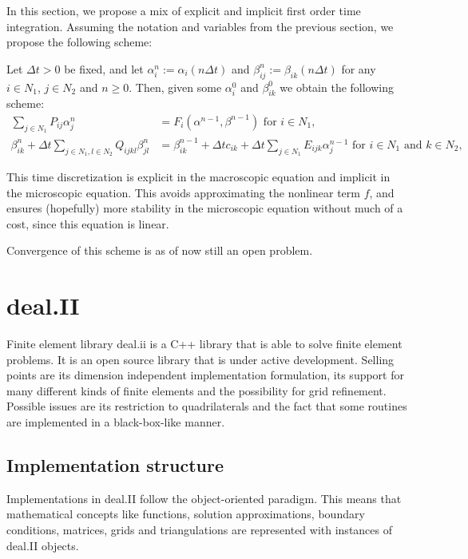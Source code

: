 \documentclass{article}
\begin{document}
In this section, we propose a mix of explicit and implicit first order time integration. Assuming the notation and variables from the previous section, we propose the following scheme:

Let $\Delta t>0$ be fixed, and let $\alpha_i^n := \alpha_i(n\Delta t)$ and $\beta_{ij}^n := \beta_{ik}(n\Delta t)$ for any $i\in N_1$, $j \in N_2$ and $n\geq0$. Then, given some $\alpha_i^0$ and $\beta_{ik}^0$ we obtain the following scheme:
\begin{align}
    \sum_{j\in N_1} P_{ij} \alpha_j^n &= F_i(\alpha^{n-1},\beta^{n-1})\label{eq:discr_alpha} \mbox{ for }i\in N_1,\\
    \beta_{ik}^{n} + \Delta t\sum_{j\in N_1,l\in N_2} Q_{ijkl} \beta_{jl}^{n} &= \beta_{ik}^{n-1} + \Delta tc_{ik} + \Delta t\sum_{j\in N_1} E_{ijk}\alpha_j^{n-1}\label{eq:discr_beta}\mbox{ for }i\in N_1\mbox{ and }k \in N_2,
\end{align}

This time discretization is explicit in the macroscopic equation and implicit in the microscopic equation. This avoids approximating the nonlinear term $f$, and ensures (hopefully) more stability in the microscopic equation without much of a cost, since this equation is linear.

Convergence of this scheme is as of now still an open problem.

\section{deal.II}
\label{sec:dealii}

Finite element library deal.ii is a C++ library that is able to solve finite element problems. It is an open source library that is under active development. Selling points are its dimension independent implementation formulation, its support for many different kinds of finite elements and the possibility for grid refinement. Possible issues are its restriction to quadrilaterals and the fact that some routines are implemented in a black-box-like manner.

\subsection{Implementation structure}
Implementations in deal.II follow the object-oriented paradigm. This means that mathematical concepts like functions, solution approximations, boundary conditions, matrices, grids and triangulations are represented with instances of deal.II objects.
\end{document}
